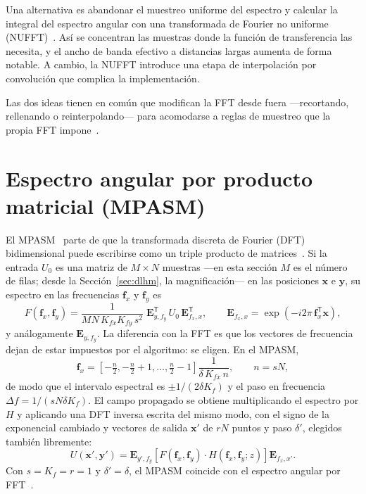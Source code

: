 Una alternativa es abandonar el muestreo uniforme del espectro y calcular la
integral del espectro angular con una transformada de Fourier no uniforme
(NUFFT)~\cite{kim2014}. Así se concentran las muestras donde la función de
transferencia las necesita, y el ancho de banda efectivo a distancias largas
aumenta de forma notable. A cambio, la NUFFT introduce una etapa de
interpolación por convolución que complica la implementación.

Las dos ideas tienen en común que modifican la FFT desde fuera ---recortando,
rellenando o reinterpolando--- para acomodarse a reglas de muestreo que la
propia FFT impone~\cite{zhao2020}.

\section{Espectro angular por producto matricial (MPASM)}
\label{sec:mpasm}

El MPASM~\cite{zhao2020} parte de que la transformada discreta de Fourier
(DFT) bidimensional puede escribirse como un triple producto de
matrices~\cite{schmidt2010}. Si la entrada $U_0$ es una matriz de $M\times N$
muestras ---en esta sección $M$ es el número de filas; desde la
Sección~\ref{sec:dlhm}, la magnificación--- en las posiciones $\mathbf{x}$ e $\mathbf{y}$, su espectro en las
frecuencias $\mathbf{f}_x$ y $\mathbf{f}_y$ es
\begin{equation}
  F(\mathbf{f}_x, \mathbf{f}_y) = \frac{1}{MN\,K_{fx}K_{fy}\,s^2}\;
  \mathbf{E}_{y,f_y}^{\mathsf{T}}\, U_0\, \mathbf{E}_{f_x,x}^{\mathsf{T}},
  \qquad
  \mathbf{E}_{f_x,x} = \exp\!\left(-i2\pi\,\mathbf{f}_x^{\mathsf{T}}\mathbf{x}\right),
  \label{eq:dft-matricial}
\end{equation}
y análogamente $\mathbf{E}_{y,f_y}$. La diferencia con la FFT es que los
vectores de frecuencia dejan de estar impuestos por el algoritmo: se eligen.
En el MPASM,
\begin{equation}
  \mathbf{f}_x = \left[-\tfrac{n}{2}, -\tfrac{n}{2}+1, \ldots, \tfrac{n}{2}-1\right]
  \frac{1}{\delta\,K_{fx}\,n}, \qquad n = sN,
  \label{eq:fx-mpasm}
\end{equation}
de modo que el intervalo espectral es $\pm 1/(2\delta K_f)$ y el paso en
frecuencia $\Delta f = 1/(sN\delta K_f)$. El campo propagado se obtiene
multiplicando el espectro por $H$ y aplicando una DFT inversa escrita del mismo
modo, con el signo de la exponencial cambiado y vectores de salida $\mathbf{x}'$ de $rN$ puntos y paso $\delta'$,
elegidos también libremente:
\begin{equation}
  U(\mathbf{x}', \mathbf{y}') = \mathbf{E}_{y',f_y}
  \left[ F(\mathbf{f}_x, \mathbf{f}_y) \cdot H(\mathbf{f}_x, \mathbf{f}_y; z) \right]
  \mathbf{E}_{f_x,x'}.
  \label{eq:mpasm}
\end{equation}
Con $s = K_f = r = 1$ y $\delta' = \delta$, el MPASM coincide con el espectro
angular por FFT~\cite{zhao2020}.

